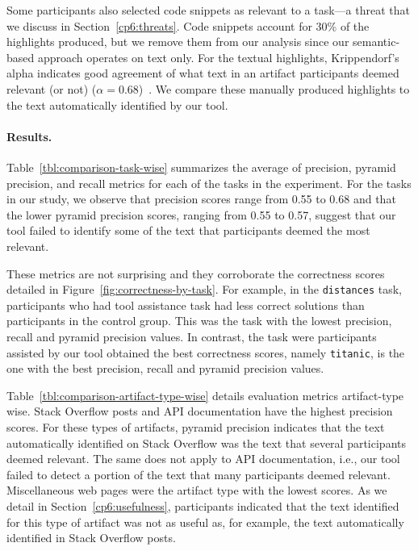 Some participants also selected code snippets as relevant to a task---a threat that we discuss in Section~\ref{cp6:threats}. 
Code snippets account for 30\% of the highlights produced, but we remove them from our analysis since our semantic-based approach 
operates on text only. For the textual highlights,
Krippendorf's alpha indicates good agreement of what text in an artifact participants deemed relevant (or not) ($\alpha = 0.68$)~\cite{Krippendorff1980, passonneau2006}.
We compare these manually produced highlights to the text automatically identified by our tool.





\paragraph{\textbf{Results.}}




Table~\ref{tbl:comparison-task-wise} summarizes the average of precision, pyramid precision, and recall metrics for each of the tasks in the experiment.
For the tasks in our study, we observe that precision scores range from 0.55 to 0.68 and that 
the lower pyramid precision scores, ranging from 0.55 to 0.57, suggest that our tool failed to identify some of the text that participants deemed the most relevant.




These metrics are not surprising and they corroborate 
the correctness scores detailed in Figure~\ref{fig:correctness-by-task}. For example, 
in the \texttt{distances} task, participants who had tool assistance  task had less correct solutions than participants in the control group.
This was the task with the lowest precision, recall and pyramid precision values. 
In contrast, the task were participants assisted by our tool obtained the best correctness scores, namely \texttt{titanic}, is the one with the best precision, recall and pyramid precision values.








Table~\ref{tbl:comparison-artifact-type-wise} details evaluation metrics artifact-type wise. 
Stack Overflow posts and API documentation have the highest precision scores. For these types of artifacts, pyramid precision indicates that the 
text automatically identified on Stack Overflow was the text that several participants deemed relevant. 
The same does not apply to API documentation, i.e., our tool failed to detect a portion of the text that many participants deemed relevant. 
Miscellaneous web pages were the artifact type with the lowest scores. As we detail in Section~\ref{cp6:usefulness},
participants indicated that the text identified for this type of artifact was not as useful as, for example, the text 
automatically identified in Stack Overflow posts.










